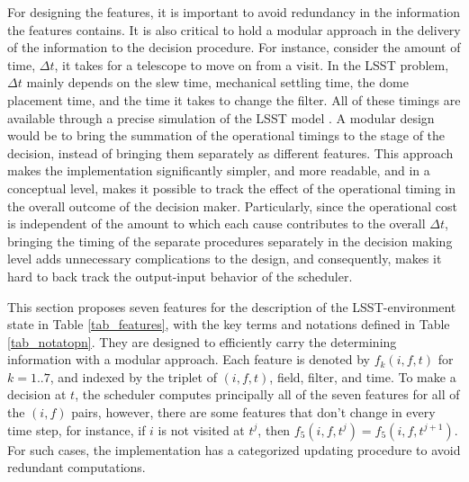 \documentclass[12pt]{aastex62}
\theoremstyle{definition}
\begin{document}
For designing the features, it is important to avoid redundancy in the information the features contains. It is also critical to hold a modular approach in the delivery of the information to the decision procedure. For instance, consider the amount of time, $\Delta t$, it takes for a telescope to move on from a visit. In the LSST problem, $\Delta t$ mainly depends on the slew time, mechanical settling time, the dome placement time, and the time it takes to change the filter. All of these timings are available through a precise simulation of the LSST model \citep{delgado2014lsst}. A modular design would be to bring the summation of the operational timings to the stage of the decision, instead of bringing them separately as different features. This approach makes the implementation significantly simpler, and more readable, and in a conceptual level, makes it possible to track the effect of the operational timing in the overall outcome of the decision maker. Particularly, since the operational cost is independent of the amount to which each cause contributes to the overall $\Delta t$, bringing the timing of the separate procedures separately in the decision making level adds unnecessary complications to the design, and consequently, makes it hard to back track the output-input behavior of the scheduler. 

This section proposes seven features for the description of the LSST-environment state in Table \ref{tab_features}, with the key terms and notations defined in Table \ref{tab_notatopn}. They are designed to efficiently carry the determining information with a modular approach. Each feature is denoted by $f_k(i,f,t)$ for $k= 1..7$, and indexed by the triplet of $(i,f,t)$, field, filter, and time. To make a decision at $t$, the scheduler computes principally all of the seven features for all of the $(i,f)$ pairs, however, there are some features that don't change in every time step, for instance, if $i$ is not visited at $t^j$, then $f_5(i,f,t^j)= f_5(i,f,t^{j+1})$. For such cases, the implementation has a categorized updating procedure to avoid redundant computations.
\end{document}
